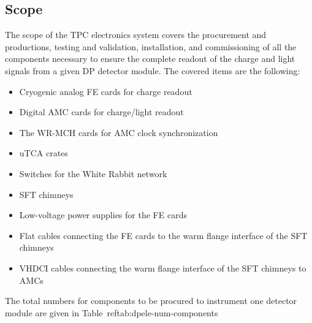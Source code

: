 

\subsection{Scope}
\label{sec:fddp-tpc-elec-scope}

The scope of the TPC electronics system covers the procurement and productions, testing and validation, installation, and commissioning of all the components necessary to ensure the complete readout of the charge and light signals from a given DP detector module. The covered items are the following:
\begin{itemize}
\item{Cryogenic analog FE cards for charge readout}
\item{Digital AMC cards for charge/light readout}
\item{The WR-MCH cards for AMC clock synchronization}
\item{uTCA crates}
\item{Switches for the White Rabbit network}
\item{SFT chimneys}
\item{Low-voltage power supplies for the FE cards}
\item{Flat cables connecting the FE cards to the warm flange interface of the SFT chimneys}
\item{VHDCI cables connecting the warm flange interface of the SFT chimneys to AMCs}
\end{itemize}

The total numbers for components to be procured to instrument one detector module are given in Table~ref{tab:dpele-num-components}

